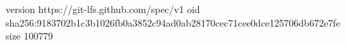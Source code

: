 version https://git-lfs.github.com/spec/v1
oid sha256:9183702b1c3b1026fb0a3852c94ad0ab28170cec71cee0dce125706db672e7fe
size 100779
